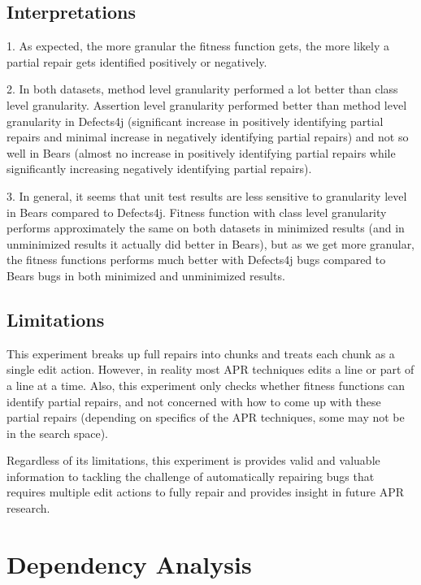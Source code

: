 \documentclass[sigconf, timestamp-false, anonymous=true]{acmart}
\begin{document}
\subsection{Interpretations}

1. As expected, the more granular the fitness function gets, the more likely a partial repair gets identified positively or negatively.

2. In both datasets, method level granularity performed a lot better than class level granularity. Assertion level granularity performed better than method level granularity in Defects4j (significant increase in positively identifying partial repairs and minimal increase in negatively identifying partial repairs) and not so well in Bears (almost no increase in positively identifying partial repairs while significantly increasing negatively identifying partial repairs).

3. In general, it seems that unit test results are less sensitive to granularity level in Bears compared to Defects4j. Fitness function with class level granularity performs approximately the same on both datasets in minimized results (and in unminimized results it actually did better in Bears), but as we get more granular, the fitness functions performs much better with Defects4j bugs compared to Bears bugs in both minimized and unminimized results.

\subsection{Limitations}

This experiment breaks up full repairs into chunks and treats each chunk as a single edit action. However, in reality most APR techniques edits a line or part of a line at a time. Also, this experiment only checks whether fitness functions can identify partial repairs, and not concerned with how to come up with these partial repairs (depending on specifics of the APR techniques, some may not be in the search space).

Regardless of its limitations, this experiment is provides valid and valuable information to tackling the challenge of automatically repairing bugs that requires multiple edit actions to fully repair and provides insight in future APR research.


\section{Dependency Analysis}
\end{document}
